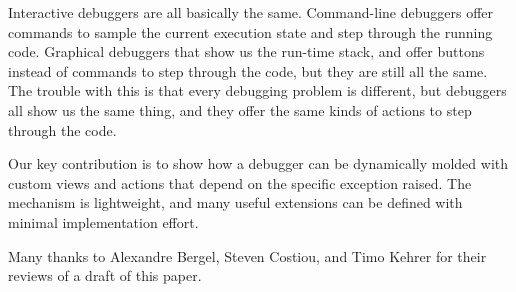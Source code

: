 \documentclass[sigplan,screen]{acmart} %
\begin{document}
Interactive debuggers are all basically the same.
Command-line debuggers offer commands to sample the current execution state and step through the running code.
Graphical debuggers that show us the run-time stack, and offer buttons instead of commands to step through the code, but they are still all the same.
The trouble with this is that every debugging problem is different, but debuggers all show us the same thing, and they offer the same kinds of actions to step through the code.

Our key contribution is to show how a debugger can be dynamically molded with custom views and actions that depend on the specific exception raised.
The mechanism is lightweight, and many useful extensions can be defined with minimal implementation effort.

\begin{acks}
Many thanks to Alexandre Bergel, Steven Costiou, and Timo Kehrer for their reviews of a draft of this paper.
\end{acks}



\end{document}
